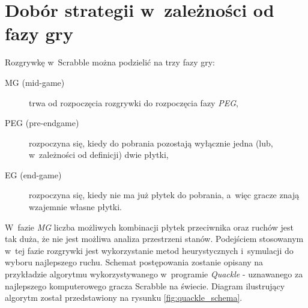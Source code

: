 \documentclass[a4paper,twocolumn,12pt]{article}
\theoremstyle{definition}
\begin{document}
\section*{Dobór strategii w~zależności od fazy gry}

Rozgrywkę w~Scrabble można podzielić na trzy fazy gry:

\begin{description}
 \item [MG (mid-game)] trwa od rozpoczęcia rozgrywki do rozpoczęcia fazy \emph{PEG},
 \item [PEG (pre-endgame)] rozpoczyna się, kiedy do pobrania pozostają wyłącznie jedna (lub, w~zależności od definicji) dwie płytki,
 \item [EG (end-game)] rozpoczyna się, kiedy nie ma już płytek do pobrania, a~więc gracze znają wzajemnie własne płytki.
\end{description}

W~fazie \emph{MG} liczba możliwych kombinacji płytek przeciwnika oraz ruchów jest tak duża, że nie jest możliwa analiza przestrzeni stanów. Podejściem stosowanym w~tej fazie rozgrywki jest wykorzystanie metod heurystycznych i~symulacji do wyboru najlepszego ruchu. Schemat postępowania zostanie opisany na przykładzie algorytmu wykorzystywanego w~programie \emph{Quackle} - uznawanego za najlepszego komputerowego gracza Scrabble na świecie. \cite{quackle_algorithm} Diagram ilustrujący algorytm został przedstawiony na rysunku \ref{fig:quackle_schema}.
\end{document}
